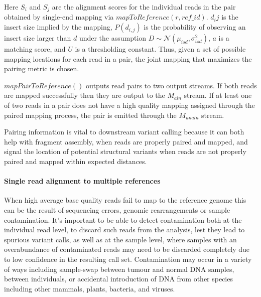 Here $S_i$ and $S_j$ are the alignment scores for the individual reads in the pair obtained by single-end mapping via $mapToReference(r, ref\_id)$. $d_ij$ is the insert size implied by the mapping, $P(d_{i,j})$ is the probability of observing an insert size larger than $d$ under the assumption $D \sim \mathcal{N}(\mu_{isd}, \sigma_{isd}^2)$, $a$ is a matching score, and $U$ is a thresholding constant. Thus, given a set of possible mapping locations for each read in a pair, the joint mapping that maximizes the pairing metric is chosen.

$mapPairToReference()$ outputs read pairs to two output streams. If both reads are mapped successfully then they are output to the $M_{aln}$ stream. If at least one of two reads in a pair does not have a high quality mapping assigned through the paired mapping process, the pair is emitted through the $M_{unaln}$ stream.

Pairing information is vital to downstream variant calling because it can both help with fragment assembly, when reads are properly paired and mapped, and signal the location of potential structural variants when reads are not properly paired and mapped within expected distances.

\paragraph{Single read alignment to multiple references}
When high average base quality reads fail to map to the reference genome this can be the result of sequencing errors, genomic rearrangements or sample contamination. It's important to be able to detect contamination both at the individual read level, to discard such reads from the analysis, lest they lead to spurious variant calls, as well as at the sample level, where samples with an overabundance of contaminated reads may need to be discarded completely due to low confidence in the resulting call set. Contamination may occur in a variety of ways including sample-swap between tumour and normal DNA samples, between individuals, or accidental introduction of DNA from other species including other mammals, plants, bacteria, and viruses. 

